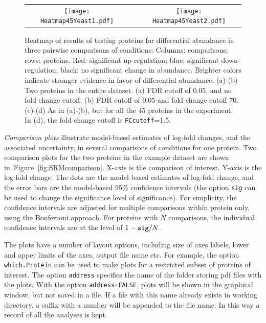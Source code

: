 \documentclass[11pt]{article}
\def\figref#1{Figure~\ref{fig:#1}}
\begin{document}
\begin{figure}[h!]
\begin{center}
\begin{tabular}{ccc}
\texttt{[image: Heatmap45Yeast1.pdf]}&&
\texttt{[image: Heatmap45Yeast2.pdf]}
\end{tabular}
\vspace{-0.3cm}
\caption{\small Heatmap of results of testing proteins for differential abundance in three pairwise comparisons of conditions. Columns: comparisons; rows: proteins. Red: significant up-regulation; blue: significant down-regulation; black: no significant change in abundance. Brighter colors indicate stronger evidence in favor of differential abundance. (a)-(b) Two proteins in the entire dataset. (a) FDR cutoff of 0.05, and no fold change cutoff. (b) FDR cutoff of 0.05 and fold change cutoff 70. (c)-(d) As in (a)-(b), but for all the 45 proteins in the experiment. In (d), the fold change cutoff is {\tt FCcutoff}=1.5. \label{fig:SRMheatmap}}
\end{center}
\end{figure}


\clearpage
{\it Comparison plots} illustrate model-based estimates of log-fold changes, and the associated uncertainty, in several comparisons of conditions for one protein. Two comparison plots for the two proteins in the example dataset are shown in~\figref{SRMcomparison}. X-axis is the comparison of interest. Y-axis is the log fold change. The dots are the model-based estimates of log-fold change, and the error bars are the  model-based 95\% confidence intervals (the option {\tt sig} can be used to change the significance level of significance). For simplicity, the confidence intervals are adjusted for multiple comparisons within protein only, using the Bonferroni approach. For proteins with $N$ comparisons, the individual confidence intervals are at the level of $1-\mbox{\tt sig}/N$.

The plots have a number of layout options, including size of axes labels, lower and apper limits of the axes, output file name etc. For example, the option {\tt which.Protein} can be used to make plots for a restricted subset of proteins of interest. The option {\tt address} specifies the name of the folder storing pdf files with the plots. With the option {\tt address=FALSE}, plots will be shown in the graphical window, but not saved in a file. If a file with this name already exists in working directory, a suffix with a number will be appended to the file name. In this way a record of all the analyses is kept.


\begin{small}
\begin{Schunk}
\end{Schunk}
\end{small}
\end{document}
